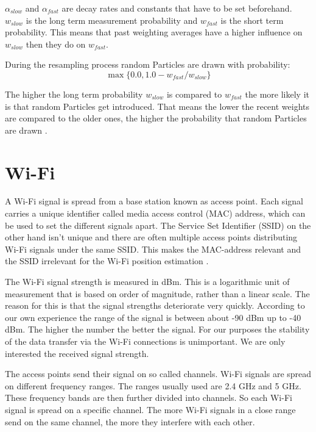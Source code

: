 $\alpha_{slow}$ and $\alpha_{fast}$ are decay rates and constants that have to be set beforehand. $w_{slow}$ is the long term measurement probability and $w_{fast}$ is the short term probability. This means that past weighting averages have a higher influence on $w_{slow}$ then they do on $w_{fast}$. 

During the resampling process random \gls{Particle}s are drawn with probability:
\begin{equation}\label{eq:quality}
\max\{0.0, 1.0-w_{fast}/w_{slow}\}
\end{equation}

The higher the long term probability $w_{slow}$ is compared to $w_{fast}$ the more likely it is that random \gls{Particle}s get introduced. That means the lower the recent weights are compared to the older ones, the higher the probability that random \gls{Particle}s are drawn \citep[p.\ 258-259]{Thrun:2005:PR:1121596}.
\section{Wi-Fi}\label{sec:wifi}
A Wi-Fi signal is spread from a base station known as access point. Each signal carries a unique identifier called media access control (MAC) address, which can be used to set the different signals apart. The Service Set Identifier (\Gls{SSID}) on the other hand isn't unique and there are often multiple access points distributing Wi-Fi signals under the same \Gls{SSID}. This makes the \Gls{MAC-address} relevant and the \Gls{SSID} irrelevant for the Wi-Fi position estimation \citep{ieee802.11-2012}.

The Wi-Fi signal strength is measured in dBm. This is a logarithmic unit of measurement that is based on order of magnitude, rather than a linear scale. The reason for this is that the signal strengths deteriorate very quickly. According to our own experience the range of the signal is between about -90 dBm up to -40 dBm. The higher the number the better the signal. For our purposes the stability of the data transfer via the Wi-Fi connections is unimportant. We are only interested the received signal strength.

The access points send their signal on so called channels. Wi-Fi signals are spread on different frequency ranges. The ranges usually used are 2.4 GHz and 5 GHz. These frequency bands are then further divided into channels. So each Wi-Fi signal is spread on a specific channel. The more Wi-Fi signals in a close range send on the same channel, the more they interfere with each other. 

